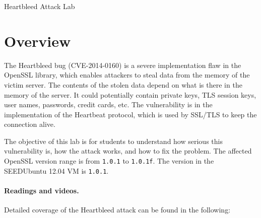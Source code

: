 




\newcommand{\heartFigs}{./Figs}




\begin{center}
{\LARGE Heartbleed Attack Lab}
\end{center}




\section{Overview}



The Heartbleed bug (CVE-2014-0160) is a severe implementation flaw in the
OpenSSL library, which enables attackers to steal data 
from the memory of the victim server. The contents of the stolen data
depend on what is there in the memory of the server. It could
potentially contain private keys, TLS session keys, user names,
passwords, credit cards, etc. The vulnerability is in the implementation of
the Heartbeat protocol,  which is used by SSL/TLS to keep the connection alive. 


The objective of this lab is for students to understand how serious this
vulnerability is, how the attack works, and how to fix the problem. The
affected OpenSSL version range is from {\tt 1.0.1} to {\tt 1.0.1f}. The
version in the SEEDUbuntu 12.04 VM is {\tt 1.0.1}. 



\paragraph{Readings and videos.}
Detailed coverage of the Heartbleed attack can be found in the following:

